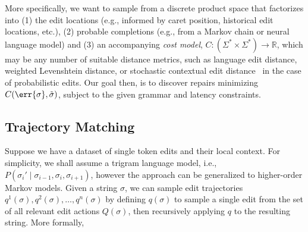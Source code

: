 \documentclass[runningheads]{llncs}
\begin{document}
%
%

More specifically, we want to sample from a discrete product space that factorizes into (1) the edit locations (e.g., informed by caret position, historical edit locations, etc.), (2) probable completions (e.g., from a Markov chain or neural language model) and (3) an accompanying \textit{cost model}, $C: (\Sigma^* \times \Sigma^*) \rightarrow \mathbb{R}$, which may be any number of suitable distance metrics, such as language edit distance, weighted Levenshtein distance, or stochastic contextual edit distance~\cite{cotterell+al.acl14} in the case of probabilistic edits. Our goal then, is to discover repairs minimizing $C(\err{\sigma}, \tilde{\sigma})$, subject to the given grammar and latency constraints.

\subsection{Trajectory Matching}

Suppose we have a dataset of single token edits and their local context. For simplicity, we shall assume a trigram language model, i.e., $P(\sigma_i' \mid \sigma_{i-1}, \sigma_i, \sigma_{i+1})$, however the approach can be generalized to higher-order Markov models. Given a string $\sigma$, we can sample edit trajectories $q^1(\sigma), q^2(\sigma), \ldots, q^n(\sigma)$ by defining $q(\sigma)$ to sample a single edit from the set of all relevant edit actions $Q(\sigma)$, then recursively applying $q$ to the resulting string. More formally,
\end{document}
